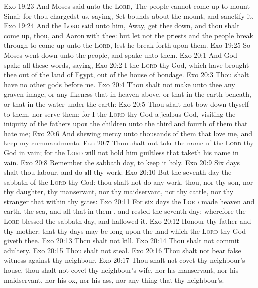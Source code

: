 \vs Exo 19:23 And Moses said unto the \textsc{Lord}, The people cannot come up to mount Sinai: for thou chargedst us, saying, Set bounds about the mount, and sanctify it.
\vs Exo 19:24 And the \textsc{Lord} said unto him, Away, get thee down, and thou shalt come up, thou, and Aaron with thee: but let not the priests and the people break through to come up unto the \textsc{Lord}, lest he break forth upon them.
\vs Exo 19:25 So Moses went down unto the people, and spake unto them.
\vs Exo 20:1 And God spake all these words, saying,
\vs Exo 20:2 I  the \textsc{Lord} thy God, which have brought thee out of the land of Egypt, out of the house of bondage.
\vs Exo 20:3 Thou shalt have no other gods before me.
\vs Exo 20:4 Thou shalt not make unto thee any graven image, or any likeness  that  in heaven above, or that  in the earth beneath, or that  in the water under the earth:
\vs Exo 20:5 Thou shalt not bow down thyself to them, nor serve them: for I the \textsc{Lord} thy God  a jealous God, visiting the iniquity of the fathers upon the children unto the third and fourth  of them that hate me;
\vs Exo 20:6 And shewing mercy unto thousands of them that love me, and keep my commandments.
\vs Exo 20:7 Thou shalt not take the name of the \textsc{Lord} thy God in vain; for the \textsc{Lord} will not hold him guiltless that taketh his name in vain.
\vs Exo 20:8 Remember the sabbath day, to keep it holy.
\vs Exo 20:9 Six days shalt thou labour, and do all thy work:
\vs Exo 20:10 But the seventh day  the sabbath of the \textsc{Lord} thy God:  thou shalt not do any work, thou, nor thy son, nor thy daughter, thy manservant, nor thy maidservant, nor thy cattle, nor thy stranger that  within thy gates:
\vs Exo 20:11 For  six days the \textsc{Lord} made heaven and earth, the sea, and all that in them , and rested the seventh day: wherefore the \textsc{Lord} blessed the sabbath day, and hallowed it.
\vs Exo 20:12 Honour thy father and thy mother: that thy days may be long upon the land which the \textsc{Lord} thy God giveth thee.
\vs Exo 20:13 Thou shalt not kill.
\vs Exo 20:14 Thou shalt not commit adultery.
\vs Exo 20:15 Thou shalt not steal.
\vs Exo 20:16 Thou shalt not bear false witness against thy neighbour.
\vs Exo 20:17 Thou shalt not covet thy neighbour's house, thou shalt not covet thy neighbour's wife, nor his manservant, nor his maidservant, nor his ox, nor his ass, nor any thing that  thy neighbour's.
